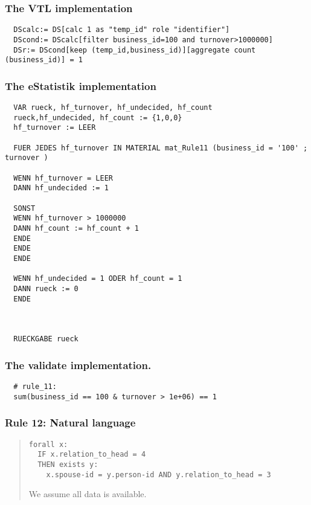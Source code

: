 \subsubsection*{The VTL implementation}
\begin{verbatim}
  DScalc:= DS[calc 1 as "temp_id" role "identifier"]
  DScond:= DScalc[filter business_id=100 and turnover>1000000]
  DSr:= DScond[keep (temp_id,business_id)][aggregate count (business_id)] = 1
\end{verbatim}
\subsubsection*{The eStatistik implementation}
\begin{verbatim}
  VAR rueck, hf_turnover, hf_undecided, hf_count
  rueck,hf_undecided, hf_count := {1,0,0}
  hf_turnover := LEER

  FUER JEDES hf_turnover IN MATERIAL mat_Rule11 (business_id = '100' ; turnover )

  WENN hf_turnover = LEER
  DANN hf_undecided := 1

  SONST
  WENN hf_turnover > 1000000
  DANN hf_count := hf_count + 1
  ENDE
  ENDE
  ENDE

  WENN hf_undecided = 1 ODER hf_count = 1
  DANN rueck := 0
  ENDE



  RUECKGABE rueck
\end{verbatim}
\subsubsection*{The validate implementation.}
\begin{verbatim}
  # rule_11:
  sum(business_id == 100 & turnover > 1e+06) == 1
\end{verbatim}


\newpage

\subsubsection*{  Rule 12: Natural language}
\begin{quote}


\begin{verbatim}
forall x: 
  IF x.relation_to_head = 4 
  THEN exists y:
    x.spouse-id = y.person-id AND y.relation_to_head = 3
\end{verbatim}

We assume all data is available.


\end{quote}
